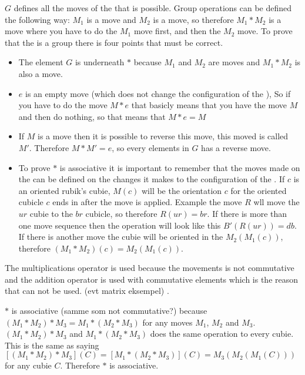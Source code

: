 $G$ defines all the moves of the \rubik{} that is possible. Group operations can be defined the following way: $M_1$ is a move and $M_2$ is a move, so therefore $M_1 * M_2$ is a move where you have to do the $M_1$ move first, and then the $M_2$ move. To prove that the \rubik{} is a group there is four points that must be correct.

\begin {itemize}
\item The element $G$ is underneath $*$ because $M_1$ and $M_2$ are moves  and $M_1 * M_2$ is also a move.

\item $e$ is an empty move (which does not change the configuration of the \rubik{}), So if you have to do the move $M * e$ that basicly means that you have the move $M$ and then do nothing, so that means that $M*e=M$

\item If $M$ is a move then it is possible to reverse this move, this moved is called $M'$. Therefore $M*M' = e$, so every elements in $G$ has a reverse move.

\item To prove $*$ is associative it is important to remember that the moves made on the \rubik{} can be defined on the changes it makes to the configuration of the \rubik{}. 
If $c$ is an oriented rubik's cubie, $M(c)$ will be the orientation $c$ for the oriented cubicle $c$ ends in after the move is applied.
Example the move $R$ wll move the $ur$ cubie to the $br$ cubicle, so therefore $R(ur)=br$. If there is more than one move sequence then the operation will look like this $B'(R(ur))=db$. If there is another move the cubie will be oriented in the $M_2 (M_1 (c))$, therefore $(M_1 *M_2 )(c)=M_2 (M_1 (c))$. 

\end {itemize}

The multiplications operator is used because the \rubik{} movements is not commutative and the addition operator is used with commutative elements which is the reason that can not be used. (evt matrix eksempel) \cite [p. 157]{Rubik87}.

$*$ is associative (samme som not commutative?) because $(M_1 *M_2 )*M_3 = M_1 *(M_2 *M_3 )$ for any moves $M_1$, $M_2$ and $M_3$. $(M_1 *M_2 )*M_3$ and $M_1 *(M_2 *M_3 )$ does the same operation to every cubie. This is the same as saying $[(M_1 *M_2 )*M_3 ](C)=[M_1 *(M_2 *M_3 )](C)=M_3 (M_2 (M_1 (C)))$ for any cubie $C$. Therefore $*$ is associative.

